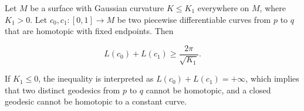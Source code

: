 Let $M$ be a surface with Gaussian curvature $K \leq K_1$ everywhere on $M$, where $K_1 > 0$. Let $c_0, c_1: [0,1] \to M$ be two piecewise differentiable curves from $p$ to $q$ that are homotopic with fixed endpoints. Then

$$L(c_0) + L(c_1) \geq \frac{2\pi}{\sqrt{K_1}}.$$

If $K_1 \leq 0$, the inequality is interpreted as $L(c_0) + L(c_1) = +\infty$, which implies that two distinct geodesics from $p$ to $q$ cannot be homotopic, and a closed geodesic cannot be homotopic to a constant curve.

